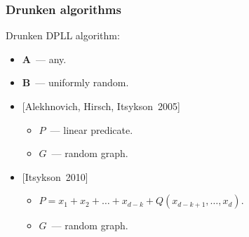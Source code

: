 \begin{frame}
	\frametitle{Drunken algorithms}

    \begin{definition}
        Drunken DPLL algorithm:
        \begin{itemize}
	        \item $\mathbf{A}$~--- any.
        	\item $\mathbf{B}$~--- uniformly random.
        \end{itemize}
    \end{definition}

    \pause
    \begin{itemize}
    	\item{} [Alekhnovich, Hirsch, Itsykson~2005]
            \begin{itemize}
	            \item $P$~--- linear predicate.
            	\item $G$~--- random graph.
            \end{itemize}
        \pause
        \item{} [Itsykson~2010]
            \begin{itemize}
	            \item $P = x_1 + x_2 + \dots + x_{d - k} +
            		Q(x_{d - k + 1}, \dots, x_d)$.
            	\item $G$~--- random graph.
            \end{itemize}
    \end{itemize}
\end{frame}

